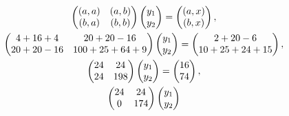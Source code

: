 \documentclass[12pt]{article}
\begin{document}
    \begin{gather*}
        \begin{pmatrix}
            \left ( a, a \right ) & \left ( a, b \right ) \\
            \left ( b, a \right ) & \left ( b, b \right )
        \end{pmatrix}
        \begin{pmatrix}
            y_1 \\
            y_2
        \end{pmatrix}
        =
        \begin{pmatrix}
            \left ( a, x \right ) \\
            \left ( b, x \right )
        \end{pmatrix}, \\
        \begin{pmatrix}
            4 + 16 + 4   & 20 + 20 - 16      \\
            20 + 20 - 16 & 100 + 25 + 64 + 9
        \end{pmatrix}
        \begin{pmatrix}
            y_1 \\
            y_2
        \end{pmatrix}
        =
        \begin{pmatrix}
            2 + 20 - 6 \\
            10 + 25 + 24 + 15
        \end{pmatrix}, \\
        \begin{pmatrix}
            24 & 24  \\
            24 & 198
        \end{pmatrix}
        \begin{pmatrix}
            y_1 \\
            y_2
        \end{pmatrix}
        =
        \begin{pmatrix}
            16 \\
            74
        \end{pmatrix}, \\
        \begin{pmatrix}
            24 & 24  \\
            0  & 174
        \end{pmatrix}
        \begin{pmatrix}
            y_1 \\
            y_2

\end{pmatrix}
\end{gather*}
\end{document}
